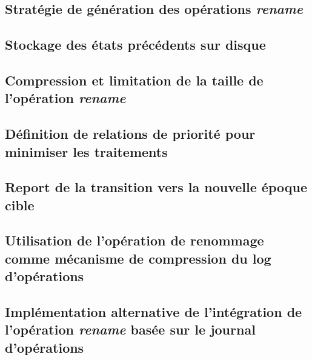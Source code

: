 
\subsection{Stratégie de génération des opérations \emph{rename}}


\subsection{Stockage des états précédents sur disque}
\label{sec:offloading-former-states}


\subsection{Compression et limitation de la taille de l'opération \emph{rename}}
\label{sec:compression-rename}


\subsection{Définition de relations de priorité pour minimiser les traitements}
\label{sec:alt-priority-relation}


\subsection{Report de la transition vers la nouvelle époque cible}
\label{sec:report-transition-to-target-epoch}


\subsection{Utilisation de l'opération de renommage comme mécanisme de compression du log d'opérations}
\label{sec:rename-as-compression-mechanism}


\subsection{Implémentation alternative de l'intégration de l'opération \emph{rename} basée sur le journal d'opérations}
\label{sec:log-based-rename-mechanism}


